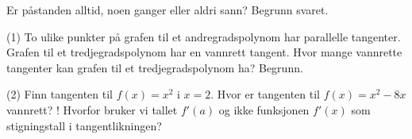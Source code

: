 Er påstanden alltid, noen ganger eller aldri sann? Begrunn svaret.
\begin{tasks}(1)
  \task To ulike punkter på grafen til et andregradspolynom har parallelle tangenter.
  \task Grafen til et tredjegradspolynom har en vannrett tangent.
  \task Hvor mange vannrette tangenter kan grafen til et tredjegradspolynom ha? Begrunn.
\end{tasks}

\begin{sjekk}
\begin{tasks}(2)
  \task Finn tangenten til $f(x) = x^2$ i $x = 2$.
  \task Hvor er tangenten til $f(x) = x^2 - 8x$ vannrett?
  \task! Hvorfor bruker vi tallet $f'(a)$ og ikke funksjonen $f'(x)$ som stigningstall i tangentlikningen?
\end{tasks}
\end{sjekk}
